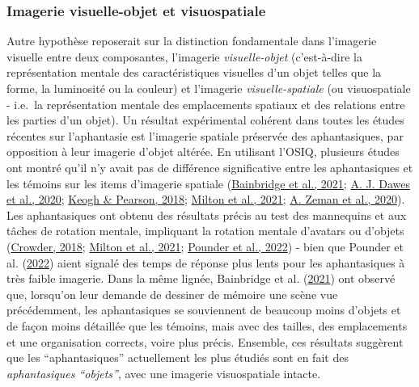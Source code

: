 \documentclass[
  12pt,
]{article}
\begin{document}
\hypertarget{imagerie-visuelle-objet-et-visuospatiale}{%
\subsubsection{Imagerie visuelle-objet et
visuospatiale}\label{imagerie-visuelle-objet-et-visuospatiale}}

Autre hypothèse reposerait sur la distinction fondamentale dans
l'imagerie visuelle entre deux composantes, l'imagerie
\emph{visuelle-objet} (c'est-à-dire la représentation mentale des
caractéristiques visuelles d'un objet telles que la forme, la luminosité
ou la couleur) et l'imagerie \emph{visuelle-spatiale} (ou visuospatiale
- i.e.~la représentation mentale des emplacements spatiaux et des
relations entre les parties d'un objet). Un résultat expérimental
cohérent dans toutes les études récentes sur l'aphantasie est l'imagerie
spatiale préservée des aphantasiques, par opposition à leur imagerie
d'objet altérée. En utilisant l'OSIQ, plusieurs études ont montré qu'il
n'y avait pas de différence significative entre les aphantasiques et les
témoins sur les items d'imagerie spatiale
(\protect\hyperlink{ref-bainbridgeQuantifyingAphantasiaDrawing2021}{Bainbridge
et al., 2021};
\protect\hyperlink{ref-dawesCognitiveProfileMultisensory2020}{A. J.
Dawes et al., 2020}; \protect\hyperlink{ref-keoghBlindMindNo2018}{Keogh
\& Pearson, 2018};
\protect\hyperlink{ref-miltonBehavioralNeuralSignatures2021}{Milton et
al., 2021};
\protect\hyperlink{ref-zemanPhantasiaPsychologicalSignificance2020}{A.
Zeman et al., 2020}). Les aphantasiques ont obtenu des résultats précis
au test des mannequins et aux tâches de rotation mentale, impliquant la
rotation mentale d'avatars ou d'objets
(\protect\hyperlink{ref-crowderDifferencesSpatialVisualization2018}{Crowder,
2018};
\protect\hyperlink{ref-miltonBehavioralNeuralSignatures2021}{Milton et
al., 2021};
\protect\hyperlink{ref-pounderOnlyMinimalDifferences2022}{Pounder et
al., 2022}) - bien que Pounder et al.
(\protect\hyperlink{ref-pounderOnlyMinimalDifferences2022}{2022}) aient
signalé des temps de réponse plus lents pour les aphantasiques à très
faible imagerie. Dans la même lignée, Bainbridge et al.
(\protect\hyperlink{ref-bainbridgeQuantifyingAphantasiaDrawing2021}{2021})
ont observé que, lorsqu'on leur demande de dessiner de mémoire une scène
vue précédemment, les aphantasiques se souviennent de beaucoup moins
d'objets et de façon moins détaillée que les témoins, mais avec des
tailles, des emplacements et une organisation corrects, voire plus
précis. Ensemble, ces résultats suggèrent que les ``aphantasiques''
actuellement les plus étudiés sont en fait des \emph{aphantasiques
``objets''}, avec une imagerie visuospatiale intacte.
\end{document}
